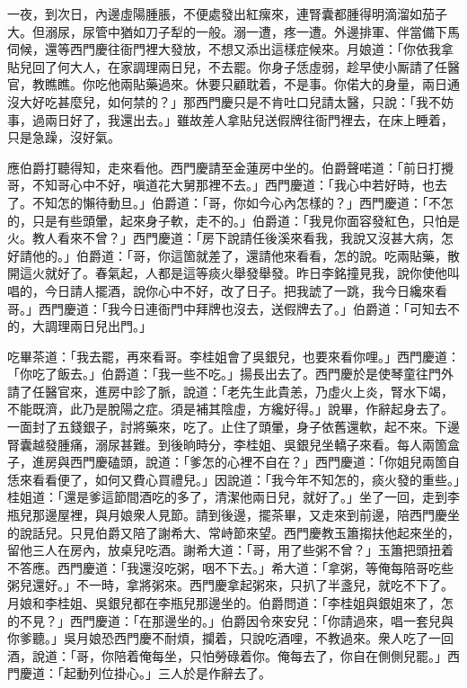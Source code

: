 一夜，到次日，內邊虛陽腫脹，不便處發出紅瘰來，連腎囊都腫得明滴溜如茄子大。但溺尿，尿管中猶如刀子犁的一般。溺一遭，疼一遭。外邊排軍、伴當備下馬伺候，還等西門慶往衙門裡大發放，不想又添出這樣症候來。月娘道：「你依我拿貼兒回了何大人，在家調理兩日兒，不去罷。你身子恁虛弱，趁早使小厮請了任醫官，教瞧瞧。你吃他兩貼藥過來。休要只顧耽着，不是事。你偌大的身量，兩日通沒大好吃甚麼兒，如何禁的？」那西門慶只是不肯吐口兒請太醫，只說：「我不妨事，過兩日好了，我還出去。」雖故差人拿貼兒送假牌往衙門裡去，在床上睡着，只是急躁，沒好氣。

應伯爵打聽得知，走來看他。西門慶請至金蓮房中坐的。伯爵聲喏道：「前日打攪哥，不知哥心中不好，嗔道花大舅那裡不去。」西門慶道：「我心中若好時，也去了。不知怎的懶待動旦。」伯爵道：「哥，你如今心內怎樣的？」西門慶道：「不怎的，只是有些頭暈，起來身子軟，走不的。」伯爵道：「我見你面容發紅色，只怕是火。教人看來不曾？」西門慶道：「房下說請任後溪來看我，我說又沒甚大病，怎好請他的。」伯爵道：「哥，你這箇就差了，還請他來看看，怎的說。吃兩貼藥，散開這火就好了。春氣起，人都是這等痰火舉發舉發。昨日李銘撞見我，說你使他叫唱的，今日請人擺酒，說你心中不好，改了日子。把我諕了一跳，我今日纔來看哥。」西門慶道：「我今日連衙門中拜牌也沒去，送假牌去了。」伯爵道：「可知去不的，大調理兩日兒出門。」

吃畢茶道：「我去罷，再來看哥。李桂姐會了吳銀兒，也要來看你哩。」西門慶道：「你吃了飯去。」伯爵道：「我一些不吃。」揚長出去了。西門慶於是使琴童往門外請了任醫官來，進房中診了脈，說道：「老先生此貴恙，乃虛火上炎，腎水下竭，不能既濟，此乃是脫陽之症。須是補其陰虛，方纔好得。」{}說畢，作辭起身去了。一面封了五錢銀子，討將藥來，吃了。止住了頭暈，{}身子依舊還軟，起不來。下邊腎囊越發腫痛，溺尿甚難。到後晌時分，李桂姐、吳銀兒坐轎子來看。每人兩箇盒子，進房與西門慶磕頭，說道：「爹怎的心裡不自在？」西門慶道：「你姐兒兩箇自恁來看看便了，如何又費心買禮兒。」因說道：「我今年不知怎的，痰火發的重些。」桂姐道：「還是爹這節間酒吃的多了，清潔他兩日兒，就好了。」坐了一回，走到李瓶兒那邊屋裡，與月娘衆人見節。請到後邊，擺茶畢，又走來到前邊，陪西門慶坐的說話兒。只見伯爵又陪了謝希大、常峙節來望。西門慶教玉簫搊扶他起來坐的，留他三人在房內，放桌兒吃酒。謝希大道：「哥，用了些粥不曾？」玉簫把頭扭着不答應。西門慶道：「我還沒吃粥，咽不下去。」希大道：「拿粥，等俺每陪哥吃些粥兒還好。」不一時，拿將粥來。西門慶拿起粥來，只扒了半盞兒，就吃不下了。月娘和李桂姐、吳銀兒都在李瓶兒那邊坐的。伯爵問道：「李桂姐與銀姐來了，怎的不見？」西門慶道：「在那邊坐的。」伯爵因令來安兒：「你請過來，唱一套兒與你爹聽。」吳月娘恐西門慶不耐煩，攔着，只說吃酒哩，不教過來。衆人吃了一回酒，說道：「哥，你陪着俺每坐，只怕勞碌着你。俺每去了，你自在側側兒罷。」西門慶道：「起動列位掛心。」三人於是作辭去了。

